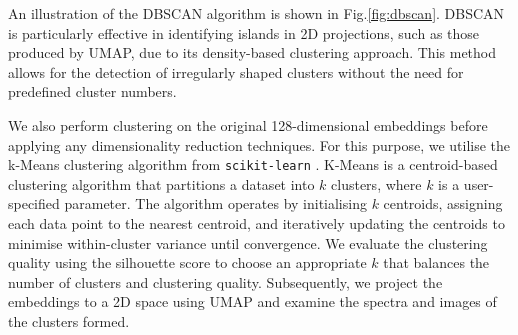 \documentclass[a4paper,12pt]{article}
\begin{document}


An illustration of the DBSCAN algorithm is shown in Fig.\ref{fig:dbscan}. DBSCAN is particularly effective in identifying islands in 2D projections, such as those produced by UMAP, due to its density-based clustering approach. This method allows for the detection of irregularly shaped clusters without the need for predefined cluster numbers.

We also perform clustering on the original 128-dimensional embeddings before applying any dimensionality reduction techniques. For this purpose, we utilise the k-Means clustering  algorithm \cite{udl} from \verb|scikit-learn| . K-Means is a centroid-based clustering algorithm that partitions a dataset into \( k \) clusters, where \( k \) is a user-specified parameter. The algorithm operates by initialising \( k \) centroids, assigning each data point to the nearest centroid, and iteratively updating the centroids to minimise within-cluster variance until convergence. We evaluate the clustering quality using the silhouette score \cite{silhouette} to choose an appropriate \( k \) that balances the number of clusters and clustering quality. Subsequently, we project the embeddings to a 2D space using UMAP and examine the spectra and images of the clusters formed.
\end{document}
